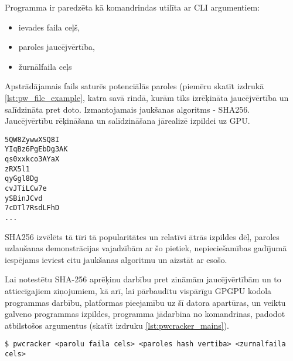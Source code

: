 Programma ir paredzēta kā komandrindas utilīta ar CLI argumentiem:
\begin{itemize}
    \item ievades faila ceļš,
    \item paroles jaucējvērtība,
    \item žurnālfaila ceļs
\end{itemize}

Apstrādājamais fails saturēs potenciālās paroles (piemēru skatīt izdrukā
\ref{lst:pw_file_example}, katra savā rindā, kurām tiks izrēķināta
jaucējvērtība un salīdzināta pret doto. Izmantojamais jaukšanas algoritms -
SHA256. Jaucējvērtību rēķināšana un salīdzināšana jārealizē izpildei uz GPU.
\cite{kursa-darbs}

\begin{lstlisting}[caption={Paroļu ieejas faila piemērs ar nejauši ģenerētām parolēm}, label=lst:pw_file_example]
5QW8ZywwXSQ8I
YIqBz6PgEbDg3AK
qs0xxkco3AYaX
zRX5l1
qyGgl8Dg
cvJTiLCw7e
ySBinJCvd
7cDTl7RsdLFhD
...
\end{lstlisting}

SHA256 izvēlēts tā tīri tā popularitātes un relatīvi ātrās izpildes dēļ,
paroles uzlaušanas demonstrācijas vajadzībām ar šo pietiek, nepieciešamības
gadījumā iespējams ieviest citu jaukšanas algoritmu un aizstāt ar esošo.

Lai notestētu SHA-256 aprēķinu darbību pret zināmām jaucējvērtībām un to
attiecīgajiem ziņojumiem, kā arī, lai pārbaudītu vispārīgu GPGPU kodola
programmas darbību, platformas pieejamību uz šī datora apartūras, un veiktu
galveno programmas izpildes, programma jādarbina no komandrinas, padodot
atbilstošos argumentus (skatīt izdruku  \ref{lst:pwcracker_mains}). \cite{kursa-darbs}

\begin{lstlisting}[caption={Programmas galvenā izpilde}, label=lst:pwcracker_mains]
$ pwcracker <parolu faila cels> <paroles hash vertiba> <zurnalfaila cels>
\end{lstlisting}

